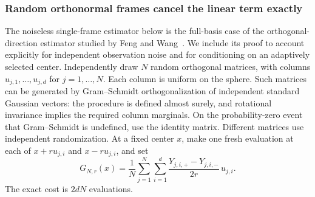 \documentclass[11pt,a4paper]{article}
\theoremstyle{definition}
\theoremstyle{remark}
\begin{document}
\subsubsection{Random orthonormal frames cancel the linear term exactly}
The noiseless single-frame estimator below is the full-basis case of the orthogonal-direction estimator studied by Feng and Wang~\cite{Feng2023}. We include its proof to account explicitly for independent observation noise and for conditioning on an adaptively selected center.
Independently draw $N$ random orthogonal matrices, with columns $u_{j,1},\ldots,u_{j,d}$ for $j=1,\ldots,N$. Each column is uniform on the sphere. Such matrices can be generated by Gram--Schmidt orthogonalization of independent standard Gaussian vectors: the procedure is defined almost surely, and rotational invariance implies the required column marginals. On the probability-zero event that Gram--Schmidt is undefined, use the identity matrix. Different matrices use independent randomization.
At a fixed center $x$, make one fresh evaluation at each of $x+ru_{j,i}$ and $x-ru_{j,i}$, and set
\begin{equation}\label{eq:frame-estimator}
 G_{N,r}(x)=\frac1N\sum_{j=1}^N\sum_{i=1}^d
 \frac{Y_{j,i,+}-Y_{j,i,-}}{2r}\,u_{j,i}.
\end{equation}
The exact cost is $2dN$ evaluations.
\end{document}
